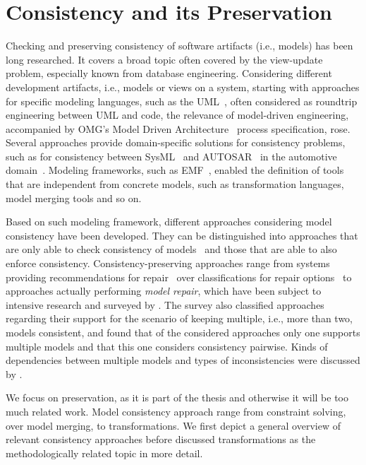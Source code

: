 \section{Consistency and its Preservation}

Checking and preserving consistency of software artifacts (i.e., models) has been long researched.
It covers a broad topic often covered by the view-update problem, especially known from database engineering.
Considering different development artifacts, i.e., models or views on a system, starting with approaches for specific modeling languages, such as the UML~\cite{dantas2005umlsync-ISPSE}, often considered as roundtrip engineering between UML and code, the relevance of model-driven engineering, accompanied by OMG's Model Driven Architecture~\cite{mda} process specification, rose.
Several approaches provide domain-specific solutions for consistency problems, such as for consistency between SysML~\cite{sysml} and AUTOSAR~\cite{scheid2015autosar} in the automotive domain~\cite{giese2010a}.
Modeling frameworks, such as \gls{EMF}~\cite{steinberg2009emf}, enabled the definition of tools that are independent from concrete models, such as transformation languages, model merging tools and so on.

Based on such modeling framework, different approaches considering model consistency have been developed.
They can be distinguished into approaches that are only able to check consistency of models~\cite{reder2012incrementalchecking} and those that are able to also enforce consistency.
Consistency-preserving approaches range from systems providing recommendations for repair~\cite{ohrndorf2018repairRecommendataions-ICSE} over classifications for repair options~\cite{kretschmer2018repairDiscovery-ICSE} to approaches actually performing \emph{model repair}, which have been subject to intensive research and surveyed by \textcite{macedo2017ModelRepairClassification-TSE}.
The survey also classified approaches regarding their support for the scenario of keeping multiple, i.e., more than two, models consistent, and found that of the considered approaches only one supports multiple models and that this one considers consistency pairwise.
Kinds of dependencies between multiple models and types of inconsistencies were discussed by \textcite{kolovos2008a}. 

We focus on preservation, as it is part of the thesis and otherwise it will be too much related work.
Model consistency approach range from constraint solving, over model merging, to transformations.
We first depict a general overview of relevant consistency approaches before discussed transformations as the methodologically related topic in more detail.


